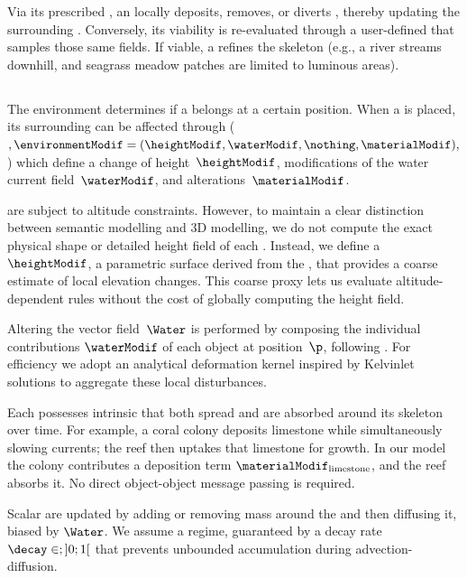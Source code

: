 Via its prescribed , an  locally deposits, removes, or diverts , thereby updating the surrounding . Conversely, its viability is re-evaluated through a user-defined  that samples those same fields. If viable, a  refines the skeleton (e.g., a river streams downhill, and seagrass meadow patches are limited to luminous areas).

\subsection{}

The environment determines if a  belongs at a certain position.
When a  is placed, its surrounding  can be affected through  ($,\environmentModif = (\heightModif, \waterModif, \nothing, \materialModif),$) which define a change of height~$\heightModif$, modifications of the water current field~$\waterModif$, and  alterations~$\materialModif$.

 are subject to altitude constraints.
However, to maintain a clear distinction between semantic modelling and 3D modelling, we do not compute the exact physical shape or detailed height field of each .
Instead, we define a ~$\heightModif$, a parametric surface derived from the , that provides a coarse estimate of local elevation changes. This coarse proxy lets us evaluate altitude-dependent rules without the cost of globally computing the height field.

Altering the vector field~$\Water$ is performed by composing the individual contributions $\waterModif$ of each object at position~$\p$, following \citep{Wejchert1991}. For efficiency we adopt an analytical deformation kernel inspired by Kelvinlet solutions \cite{DeGoes2017} to aggregate these local disturbances.

Each  possesses intrinsic  that both spread and are absorbed around its skeleton over time. For example, a coral colony deposits limestone while simultaneously slowing currents; the reef then uptakes that limestone for growth.
In our model the colony contributes a deposition term $\materialModif_{\text{limestone}}$, and the reef absorbs it. No direct object-object message passing is required.

Scalar  are updated by adding or removing mass around the  and then diffusing it, biased by $\Water$.
We assume a  regime, guaranteed by a decay rate~$\decay \in;]0; 1[$ that prevents unbounded accumulation during advection-diffusion.

